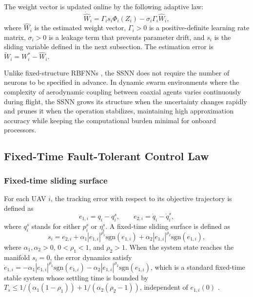 The weight vector is updated online by the following adaptive law:
\begin{equation}
    \dot{\hat{W}}_i = \Gamma_i s_i \Phi_i(Z_i) - \sigma_i \Gamma_i \hat{W}_i,
    \label{eq:weight_law}
\end{equation}
where $\hat{W}_i$ is the estimated weight vector, $\Gamma_i > 0$ is a
positive-definite learning rate matrix, $\sigma_i > 0$ is a leakage term that
prevents parameter drift, and $s_i$ is the sliding variable defined in the
next subsection. The estimation error is $\tilde{W}_i = W_i^* - \hat{W}_i$.

\begin{remark}
Unlike fixed-structure RBFNNs \cite{my1article, guettal2022fobsc}, the SSNN does not require the number of neurons
to be specified in advance. In dynamic swarm environments where the complexity
of aerodynamic coupling between coaxial agents varies continuously during
flight, the SSNN grows its structure when the uncertainty changes rapidly and
prunes it when the operation stabilizes, maintaining high approximation accuracy
while keeping the computational burden minimal for onboard processors.
\end{remark}

\subsection{Fixed-Time Fault-Tolerant Control Law}
\label{sec5:control_law}

\subsubsection{Fixed-time sliding surface}

For each UAV $i$, the tracking error with respect to its objective trajectory
is defined as
\begin{equation}
    e_{1,i} = q_i - q_i^s, \qquad e_{2,i} = \dot{q}_i - \dot{q}_i^s,
    \label{eq:tracking_errors}
\end{equation}
where $q_i^s$ stands for either $p_i^s$ or $\eta_i^s$. A fixed-time sliding
surface is defined as
\begin{equation}
    s_i = e_{2,i} + \alpha_1 |e_{1,i}|^{\rho_1} \text{sgn}(e_{1,i})
        + \alpha_2 |e_{1,i}|^{\rho_2} \text{sgn}(e_{1,i}),
    \label{eq:sliding_surface}
\end{equation}
where $\alpha_1, \alpha_2 > 0$, $0 < \rho_1 < 1$, and $\rho_2 > 1$. When the
system state reaches the manifold $s_i = 0$, the error dynamics satisfy
$\dot{e}_{1,i} = -\alpha_1|e_{1,i}|^{\rho_1}\text{sgn}(e_{1,i})
-\alpha_2|e_{1,i}|^{\rho_2}\text{sgn}(e_{1,i})$, which is a standard fixed-time
stable system whose settling time is bounded by
$T_s \leq 1/(\alpha_1(1-\rho_1)) + 1/(\alpha_2(\rho_2-1))$, independent of
$e_{1,i}(0)$ \cite{Polyakov2012}.

